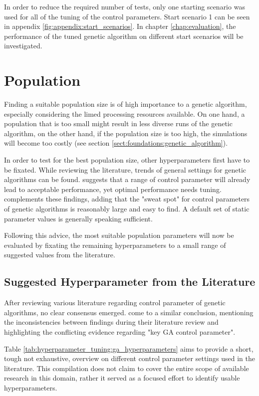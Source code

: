 In order to reduce the required number of tests, only one starting scenario was used for all of the tuning of the control parameters. Start scenario 1 can be seen in appendix \ref{fig:appendix:start_scenarios}. In chapter \ref{chap:evaluation}, the performance of the tuned genetic algorithm on different start scenarios will be investigated.

\section{Population}
\label{sect:hyperparameter_tuning:population}
Finding a suitable population size is of high importance to a genetic algorithm, especially considering the limed processing resources available. On one hand, a population that is too small might result in less diverse runs of the genetic algorithm, on the other hand, if the population size is too high, the simulations will become too costly (see section \ref{sect:foundations:genetic_algorithm}).

In order to test for the best population size, other hyperparameters first have to be fixated. While reviewing the literature, trends of general settings for genetic algorithms can be found. 
\cite{grefenstette_optimization_1986} suggests that a range of control parameter will already lead to acceptable performance, yet optimal performance needs tuning. \cite{kacprzyk_parameter_2007} complements these findings, adding that the "sweat spot" for control parameters of genetic algorithms is reasonably large and easy to find. A default set of static parameter values is generally speaking sufficient.

Following this advice, the most suitable population parameters will now be evaluated by fixating the remaining hyperparameters to a small range of suggested values from the literature.

\subsection{Suggested Hyperparameter from the Literature}
After reviewing various literature regarding control parameter of genetic algorithms, no clear consensus emerged. \cite{mills_determining_2015} come to a similar conclusion, mentioning the inconsistencies between findings during their literature review and highlighting the conflicting evidence regarding "key GA control parameter".

Table \ref{tab:hyperparameter_tuning:ga_hyperparameters} aims to provide a short, tough not exhaustive, overview on different control parameter settings used in the literature. This compilation does not claim to cover the entire scope of available research in this domain, rather it served as a focused effort to identify usable hyperparameters.

